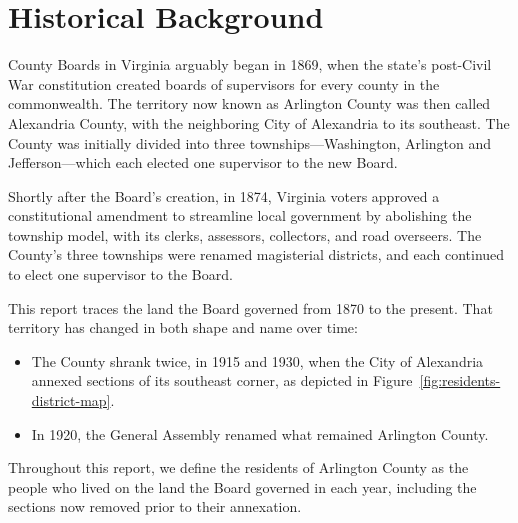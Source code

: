 \part{Historical Background}

County Boards in Virginia arguably began in 1869, when the state's post-Civil War
constitution created boards of supervisors for every county in the
commonwealth.\autocite[art.~VII, sec.~2]{vaconstitution1869} The territory now known
as Arlington County was then called Alexandria County, with the neighboring City of
Alexandria to its southeast. The County was
initially divided into three townships---Washington, Arlington and Jefferson---which
each elected one supervisor to the new Board.

Shortly after the Board's creation, in 1874, Virginia voters approved a
constitutional amendment to streamline local government by abolishing the township
model, with its clerks, assessors, collectors, and road
overseers. The County's three townships were renamed
magisterial districts, and each continued to elect one supervisor to the
Board.\autocite{vaacts1875}

This report traces the land the Board governed from 1870 to the present. That
territory has changed in both shape and name over time:
\begin{itemize}
  \item The County shrank twice, in 1915 and 1930, when the City of Alexandria
    annexed sections of its southeast corner, as depicted in
    Figure~\ref{fig:residents-district-map}.
  \item In 1920, the General Assembly renamed what remained Arlington County.
\end{itemize}
Throughout this report, we define the residents of Arlington County as the people
who lived on the land the Board governed in each year, including the sections now
removed prior to their annexation.

